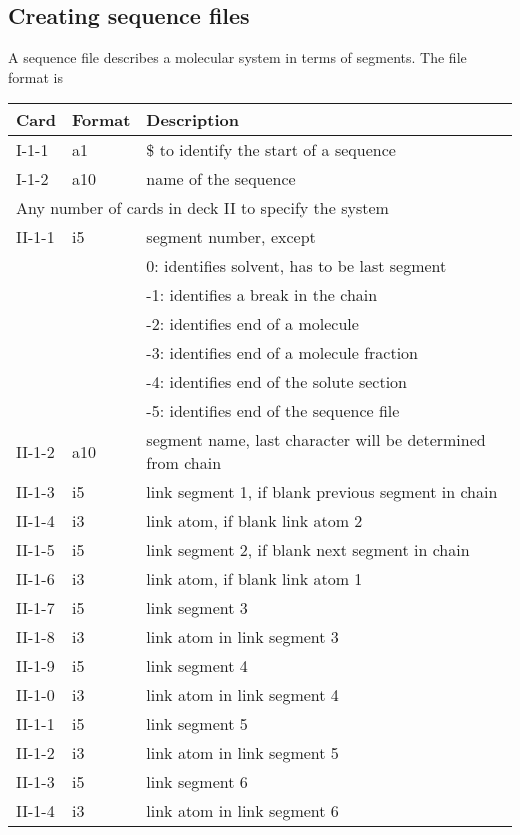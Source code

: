 \subsection{Creating sequence files}
A sequence file describes a molecular system in terms of segments. The
file format is
\begin{center}
\begin{tabular*}{150mm}{p{12mm}p{12mm}l}
\hline\hline
Card & Format & Description \\ \hline
I-1-1  & a1     & \$ to identify the start of a sequence \\
I-1-2  & a10    & name of the sequence\\
\multicolumn{3}{l}{Any number of cards in deck II to specify the system} \\
II-1-1 & i5     & segment number, except\\
       &        &  0: identifies solvent, has to be last segment\\
       &        & -1: identifies a break in the chain\\
       &        & -2: identifies end of a molecule\\
       &        & -3: identifies end of a molecule fraction\\
       &        & -4: identifies end of the solute section\\
       &        & -5: identifies end of the sequence file\\
II-1-2 & a10    & segment name, last character will be determined from chain\\
II-1-3 & i5     & link segment 1, if blank previous segment in chain\\
II-1-4 & i3     & link atom, if blank link atom 2\\
II-1-5 & i5     & link segment 2, if blank next segment in chain\\
II-1-6 & i3     & link atom, if blank link atom 1\\
II-1-7 & i5     & link segment 3\\
II-1-8 & i3     & link atom in link segment 3\\
II-1-9 & i5     & link segment 4\\
II-1-0 & i3     & link atom in link segment 4\\
II-1-1 & i5     & link segment 5\\
II-1-2 & i3     & link atom in link segment 5\\
II-1-3 & i5     & link segment 6\\
II-1-4 & i3     & link atom in link segment 6\\

\end{tabular*}
\end{center}
